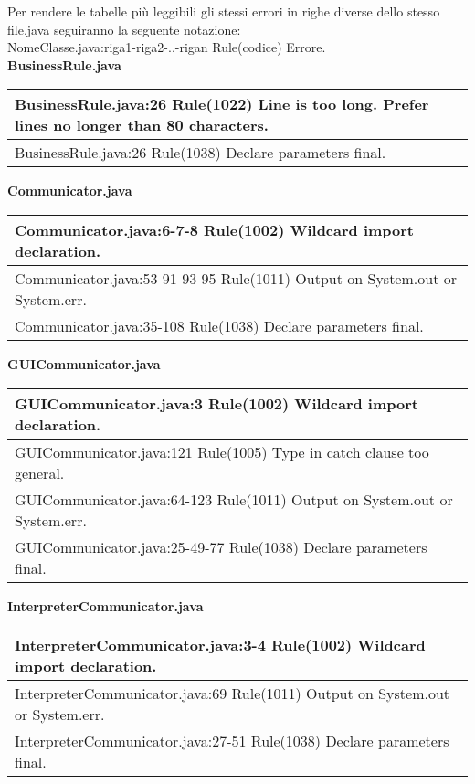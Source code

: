 Per rendere le tabelle pi\`u leggibili gli stessi errori in righe diverse dello stesso file.java seguiranno la seguente notazione: \\
NomeClasse.java:riga1-riga2-..-rigan Rule(codice) Errore. \\

\textbf{BusinessRule.java}
\begin{center}
\begin{tabular}{|p{12cm}|} \hline
BusinessRule.java:26 Rule(1022) Line is too long. Prefer lines no longer than 80 characters. \\ \hline
BusinessRule.java:26 Rule(1038) Declare parameters final. \\ \hline
\end{tabular}
\end{center}

\textbf{Communicator.java}
\begin{center}
\begin{tabular}{|p{12cm}|} \hline
Communicator.java:6-7-8 Rule(1002) Wildcard import declaration. \\ \hline
Communicator.java:53-91-93-95 Rule(1011) Output on System.out or System.err. \\ \hline
Communicator.java:35-108 Rule(1038) Declare parameters final. \\ \hline
\end{tabular}
\end{center}

\textbf{GUICommunicator.java}
\begin{center}
\begin{tabular}{|p{12cm}|} \hline
GUICommunicator.java:3 Rule(1002) Wildcard import declaration. \\ \hline
GUICommunicator.java:121 Rule(1005) Type in catch clause too general. \\ \hline
GUICommunicator.java:64-123 Rule(1011) Output on System.out or System.err. \\ \hline
GUICommunicator.java:25-49-77 Rule(1038) Declare parameters final. \\ \hline
\end{tabular}
\end{center}

\textbf{InterpreterCommunicator.java}
\begin{center}
\begin{tabular}{|p{12cm}|} \hline
InterpreterCommunicator.java:3-4 Rule(1002) Wildcard import declaration. \\ \hline
InterpreterCommunicator.java:69 Rule(1011) Output on System.out or System.err. \\ \hline
InterpreterCommunicator.java:27-51 Rule(1038) Declare parameters final.\\ \hline
\end{tabular}
\end{center}

